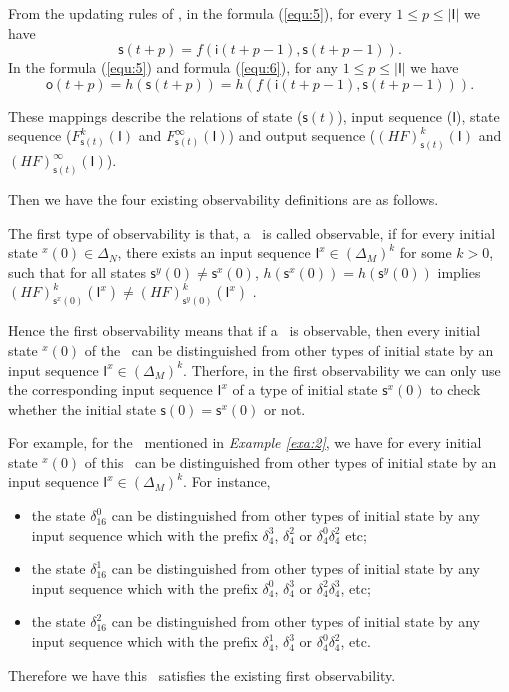   
  From the updating rules of \BCNs, in the formula (\ref{equ:5}), for every $1\le p \le |\mathsf{I}|$ we have 
 \[\mathsf{s}(t+p)=f(\mathsf{i}(t+p-1),\mathsf{s}(t+p-1)).\] 
 In the formula (\ref{equ:5}) and formula (\ref{equ:6}), for any $1\le p \le |\mathsf{I}|$ we have  
 \[\mathsf{o}(t+p)=h(\mathsf{s}(t+p))=h(f(\mathsf{i}(t+p-1),\mathsf{s}(t+p-1))).\] 

These mappings describe the relations of state ($\mathsf{s}(t)$), input sequence ($\mathsf{I}$), state sequence ($F^k_{\mathsf{s}(t)}(\mathsf{I})$ and $F^{\infty}_{\mathsf{s}(t)}(\mathsf{I})$) and output sequence ($(HF)^k_{\mathsf{s}(t)}(\mathsf{I})$ and $(HF)^{\infty}_{\mathsf{s}(t)}(\mathsf{I})$). 

Then we have the four existing observability definitions are as follows.

\begin{definition} 
The first type of observability is that, a \BCN\ is called observable, if for every initial state \State$^{x}(0)$$\in \Delta_N$, there exists an input sequence $\mathsf{I}^x\in(\Delta_M)^k$ for some $k>0$, such that for all states $\mathsf{s}^{y}(0)\neq \mathsf{s}^{x}(0)$, $h(\mathsf{s}^{x}(0))=h(\mathsf{s}^{y}(0))$ implies $(HF)^k_{\mathsf{s}^{x}(0)}(\mathsf{I}^x)\neq (HF)^k_{{\mathsf{s}^{y}(0)}}(\mathsf{I}^x)$ \cite{cheng2009controllability}.
\end{definition}

Hence the first observability means that if a \BCN\ is observable, then every initial state \State$^{x}(0)$ of the \BCN\ can be distinguished from other types of initial state by an input sequence $\mathsf{I}^x \in(\Delta_M)^k$. Therfore, in the first observability we can only use the corresponding input sequence $\mathsf{I}^x$ of a type of initial state $\mathsf{s}^{x}(0)$ to check whether the initial state $\mathsf{s}(0)=\mathsf{s}^{x}(0)$ or not. 
\begin{example}
For example, for the \BCN\ mentioned in {\em Example \ref{exa:2}}, we have for every initial state \State$^{x}(0)$ of this \BCN\ can be distinguished from other types of initial state by an input sequence $\mathsf{I}^x \in(\Delta_M)^k$.  For instance,
\begin{itemize}
  \item the state $\delta_{16}^0$ can be distinguished from other types of initial state by any input sequence which with the prefix $\delta_{4}^3$, $\delta_{4}^2$ or $\delta_{4}^0  \delta_{4}^2$  etc;
  \item the state $\delta_{16}^1$ can be distinguished from other types of initial state by any input sequence which with the prefix $\delta_{4}^0$, $\delta_{4}^3$ or $\delta_{4}^2 \delta_{4}^3$, etc;
  \item the state $\delta_{16}^2$ can be distinguished from other types of initial state by any input sequence which with the prefix $\delta_{4}^1$, $\delta_{4}^3$ or $\delta_{4}^0 \delta_{4}^2$, etc.
\end{itemize} 

Therefore we have this \BCN\ satisfies the existing first observability.
\label{exa:4}
\end{example}   

